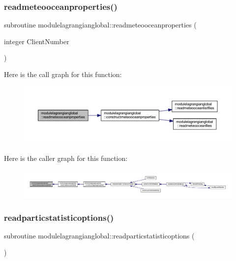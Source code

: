 \subsubsection{\texorpdfstring{readmeteooceanproperties()}{readmeteooceanproperties()}}
{\footnotesize\ttfamily subroutine modulelagrangianglobal\+::readmeteooceanproperties (\begin{DoxyParamCaption}\item[{integer}]{Client\+Number }\end{DoxyParamCaption})\hspace{0.3cm}{\ttfamily [private]}}

Here is the call graph for this function\+:\nopagebreak
\begin{figure}[H]
\begin{center}
\leavevmode
\includegraphics[width=350pt]{namespacemodulelagrangianglobal_ae1973e5270fe0bd8fe935fa360c35bd1_cgraph}
\end{center}
\end{figure}
Here is the caller graph for this function\+:\nopagebreak
\begin{figure}[H]
\begin{center}
\leavevmode
\includegraphics[width=350pt]{namespacemodulelagrangianglobal_ae1973e5270fe0bd8fe935fa360c35bd1_icgraph}
\end{center}
\end{figure}
\mbox{\label{namespacemodulelagrangianglobal_a8e12f5629f87247807ce50e9527b9fdd}} 
\subsubsection{\texorpdfstring{readparticstatisticoptions()}{readparticstatisticoptions()}}
{\footnotesize\ttfamily subroutine modulelagrangianglobal\+::readparticstatisticoptions (\begin{DoxyParamCaption}{ }\end{DoxyParamCaption})\hspace{0.3cm}{\ttfamily [private]}}

